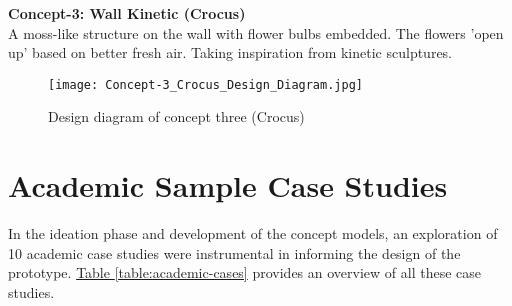 \begin{appendices}
\newpage

\textbf{Concept-3: Wall Kinetic (Crocus)} \\
A moss-like structure on the wall with flower bulbs embedded. The flowers 'open up' based on better fresh air. Taking inspiration from kinetic sculptures.

\begin{figure}[H]
    \centering
    \texttt{[image: Concept-3\_Crocus\_Design\_Diagram.jpg]}
    \caption{Design diagram of concept three (Crocus)}
    \label{fig:concept-three}
\end{figure}

\section{Academic Sample Case Studies}
\label{appendix:academic}

In the ideation phase and development of the concept models, an exploration of 10 academic case studies were instrumental in informing the design of the prototype. \hyperref[table:academic-cases]{Table \ref{table:academic-cases}} provides an overview of all these case studies.


\end{appendices}
